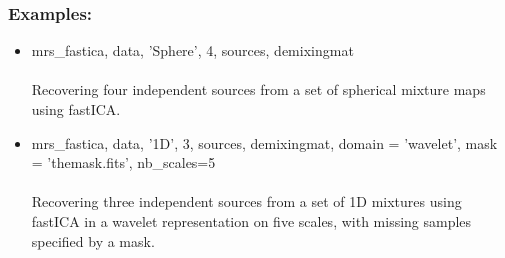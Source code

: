 \subsubsection*{Examples:} 
\begin{itemize}
\item mrs\_fastica, data, 'Sphere', 4, sources, demixingmat\\\\
Recovering four independent sources from a set of spherical mixture maps using fastICA.  

\item   mrs\_fastica, data, '1D', 3, sources, demixingmat, domain = 'wavelet', mask = 'themask.fits', nb\_scales=5\\\\
Recovering three independent sources from a set of 1D mixtures using fastICA in a wavelet representation on five scales, with missing samples specified by a mask.  

\end{itemize}



